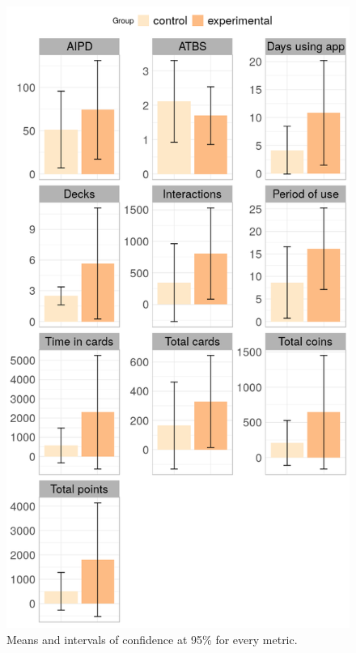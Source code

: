 \begin{figure}[htb]
    \vskip 5mm
        \begin{center}
            \includegraphics[scale=0.75]{./Figures/metrics.png}
            \caption{Means and intervals of confidence at 95\% for every metric.}
            \label{fig:metrics}
        \end{center}
    \vskip -5mm
\end{figure}